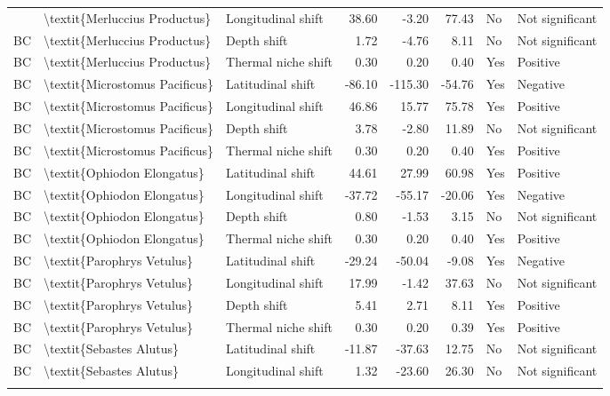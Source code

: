 \begin{longtable}[t]{lllrrrll}
{{\addlinespace
BC & \textbackslash{}textit\{Merluccius Productus\} & Longitudinal shift & 38.60 & -3.20 & 77.43 & No & Not significant\\
BC & \textbackslash{}textit\{Merluccius Productus\} & Depth shift & 1.72 & -4.76 & 8.11 & No & Not significant\\
BC & \textbackslash{}textit\{Merluccius Productus\} & Thermal niche shift & 0.30 & 0.20 & 0.40 & Yes & Positive\\
BC & \textbackslash{}textit\{Microstomus Pacificus\} & Latitudinal shift & -86.10 & -115.30 & -54.76 & Yes & Negative\\
BC & \textbackslash{}textit\{Microstomus Pacificus\} & Longitudinal shift & 46.86 & 15.77 & 75.78 & Yes & Positive\\
\addlinespace
BC & \textbackslash{}textit\{Microstomus Pacificus\} & Depth shift & 3.78 & -2.80 & 11.89 & No & Not significant\\
BC & \textbackslash{}textit\{Microstomus Pacificus\} & Thermal niche shift & 0.30 & 0.20 & 0.40 & Yes & Positive\\
BC & \textbackslash{}textit\{Ophiodon Elongatus\} & Latitudinal shift & 44.61 & 27.99 & 60.98 & Yes & Positive\\
BC & \textbackslash{}textit\{Ophiodon Elongatus\} & Longitudinal shift & -37.72 & -55.17 & -20.06 & Yes & Negative\\
BC & \textbackslash{}textit\{Ophiodon Elongatus\} & Depth shift & 0.80 & -1.53 & 3.15 & No & Not significant\\
\addlinespace
BC & \textbackslash{}textit\{Ophiodon Elongatus\} & Thermal niche shift & 0.30 & 0.20 & 0.40 & Yes & Positive\\
BC & \textbackslash{}textit\{Parophrys Vetulus\} & Latitudinal shift & -29.24 & -50.04 & -9.08 & Yes & Negative\\
BC & \textbackslash{}textit\{Parophrys Vetulus\} & Longitudinal shift & 17.99 & -1.42 & 37.63 & No & Not significant\\
BC & \textbackslash{}textit\{Parophrys Vetulus\} & Depth shift & 5.41 & 2.71 & 8.11 & Yes & Positive\\
BC & \textbackslash{}textit\{Parophrys Vetulus\} & Thermal niche shift & 0.30 & 0.20 & 0.39 & Yes & Positive\\
\addlinespace
BC & \textbackslash{}textit\{Sebastes Alutus\} & Latitudinal shift & -11.87 & -37.63 & 12.75 & No & Not significant\\
BC & \textbackslash{}textit\{Sebastes Alutus\} & Longitudinal shift & 1.32 & -23.60 & 26.30 & No & Not significant\\
}}
\end{longtable}
